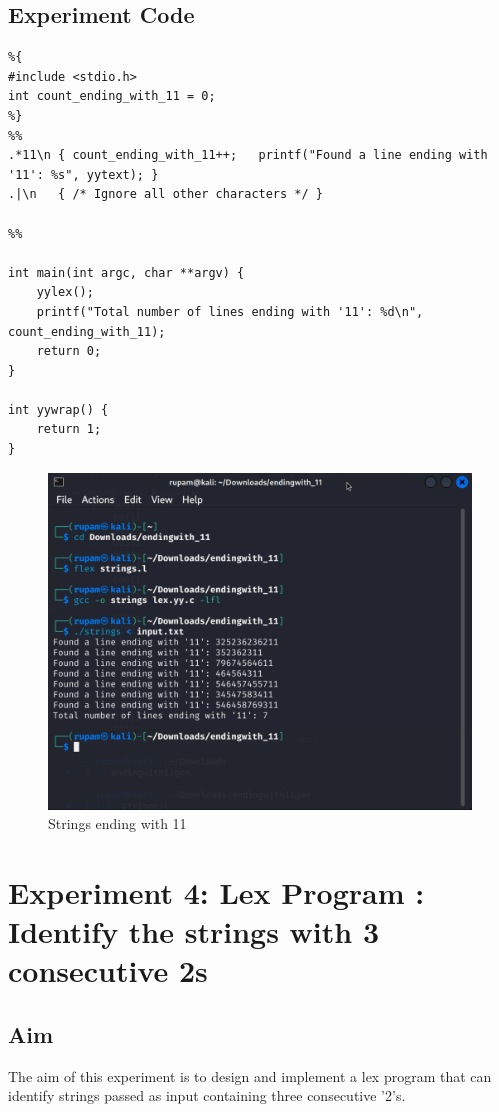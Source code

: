 \documentclass[12pt]{article}
\begin{document}
\subsection*{Experiment Code}
\begin{lstlisting}
%{
#include <stdio.h>
int count_ending_with_11 = 0;
%}
%%
.*11\n { count_ending_with_11++;   printf("Found a line ending with '11': %s", yytext); }
.|\n   { /* Ignore all other characters */ }

%%

int main(int argc, char **argv) {
    yylex();
    printf("Total number of lines ending with '11': %d\n", count_ending_with_11);
    return 0;
}

int yywrap() {
    return 1;
}
\end{lstlisting}
\begin{figure}[H]
    \centering
    \includegraphics[width=1\linewidth]{exp3output.png}
    \caption{Strings ending with 11}
\end{figure}

\newpage
\section*{Experiment 4: Lex Program : Identify the strings with 3 consecutive 2s}

\subsection*{Aim}
The aim of this experiment is to design and implement a lex program that can identify strings passed as input containing three consecutive '2's.
\end{document}
